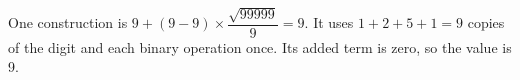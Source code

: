 One construction is $\boxed{9+(9-9)\times\dfrac{\sqrt{99999}}{9}=9}$. It uses $1+2+5+1=9$ copies of the digit and each binary operation once. Its added term is zero, so the value is 9.
